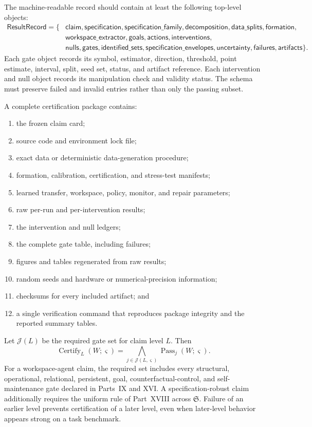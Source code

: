 The machine-readable record should contain at least the following top-level
objects:
\[
\boxed{
\begin{aligned}
\mathsf{ResultRecord}
=\{&
\mathsf{claim},
\mathsf{specification},
\mathsf{specification\_family},
\mathsf{decomposition},
\mathsf{data\_splits},
\mathsf{formation},\\
&\mathsf{workspace\_extractor},
\mathsf{goals},
\mathsf{actions},
\mathsf{interventions},\\
&\mathsf{nulls},
\mathsf{gates},
\mathsf{identified\_sets},
\mathsf{specification\_envelopes},
\mathsf{uncertainty},
\mathsf{failures},
\mathsf{artifacts}
\}.
\end{aligned}
}
\]
Each gate object records its symbol, estimator, direction, threshold, point
estimate, interval, split, seed set, status, and artifact reference. Each
intervention and null object records its manipulation check and validity
status. The schema must preserve failed and invalid entries rather than only
the passing subset.


A complete certification package contains:
\begin{enumerate}
\item the frozen claim card;
\item source code and environment lock file;
\item exact data or deterministic data-generation procedure;
\item formation, calibration, certification, and stress-test manifests;
\item learned transfer, workspace, policy, monitor, and repair parameters;
\item raw per-run and per-intervention results;
\item the intervention and null ledgers;
\item the complete gate table, including failures;
\item figures and tables regenerated from raw results;
\item random seeds and hardware or numerical-precision information;
\item checksums for every included artifact; and
\item a single verification command that reproduces package integrity and the
 reported summary tables.
\end{enumerate}


Let \(\mathcal J(L)\) be the required gate set for claim level \(L\). Then
\[
\boxed{
\operatorname{Certify}_L(W;\varsigma)
=
\bigwedge_{j\in\mathcal J(L,\varsigma)}
\operatorname{Pass}_j(W;\varsigma).
}
\]
For a workspace-agent claim, the required set includes every structural,
operational, relational, persistent, goal, counterfactual-control, and
self-maintenance gate declared in Parts~IX and XVI. A specification-robust
claim additionally requires the uniform rule of Part~XVIII across
\(\mathfrak S\). Failure of an earlier level
prevents certification of a later level, even when later-level behavior appears
strong on a task benchmark.
